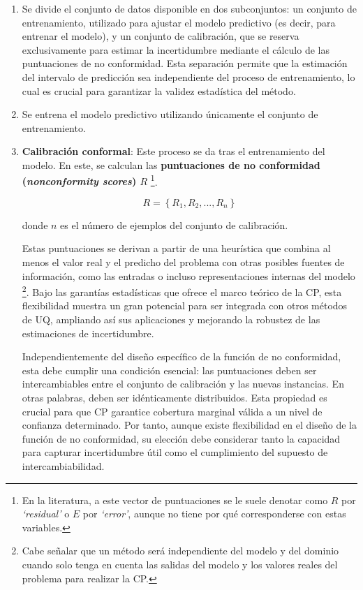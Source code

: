 \begin{enumerate}

    \item Se divide el conjunto de datos disponible en dos subconjuntos: un conjunto de entrenamiento, 
    utilizado para ajustar el modelo predictivo (es decir, para entrenar el modelo), y un conjunto de 
    calibración, que se reserva exclusivamente para estimar la incertidumbre mediante el cálculo de las 
    puntuaciones de no conformidad. Esta separación permite que la estimación del intervalo de predicción 
    sea independiente del proceso de entrenamiento, lo cual es crucial para garantizar la validez 
    estadística del método.

    \item Se entrena el modelo predictivo utilizando únicamente el conjunto de entrenamiento. 

    \item \textbf{Calibración conformal}: Este proceso se da tras el entrenamiento del modelo. En este, se 
    calculan las \textbf{puntuaciones de no conformidad (\textit{nonconformity scores}) $R$}%
    \footnote{
        En la literatura, a este vector de puntuaciones se le suele denotar como $R$ por \textit{`residual'}
        o $E$ por \textit{`error'}, aunque no tiene por qué corresponderse con estas variables. 
    }.

    $$
    R = \left\{ R_1, R_2, ..., R_{n} \right\}
    $$

    donde $n$ es el número de ejemplos del conjunto de calibración.

    Estas puntuaciones se derivan a partir de una heurística que combina al menos el valor real y el predicho 
    del problema con otras posibles fuentes de información, como las entradas o incluso representaciones 
    internas del modelo%
    \footnote{
        Cabe señalar que un método será independiente del modelo y del dominio cuando solo tenga en cuenta
        las salidas del modelo y los valores reales del problema para realizar la CP.
    }. 
    Bajo las garantías estadísticas que ofrece el marco teórico de la CP, esta flexibilidad muestra un gran 
    potencial para ser integrada con otros métodos de UQ, ampliando así sus 
    aplicaciones y mejorando la robustez de las estimaciones de incertidumbre.

    Independientemente del diseño específico de la función de no conformidad, esta debe cumplir una condición
    esencial: las puntuaciones deben ser intercambiables entre el conjunto de calibración y las nuevas 
    instancias.
    En otras palabras, deben ser idénticamente distribuidos. 
    Esta propiedad es crucial para que CP garantice cobertura marginal válida a un nivel de confianza 
    determinado.
    Por tanto, aunque existe flexibilidad en el diseño de la función de no conformidad, su elección debe 
    considerar tanto la capacidad para capturar incertidumbre útil como el cumplimiento del supuesto de 
    intercambiabilidad. 


\end{enumerate}
